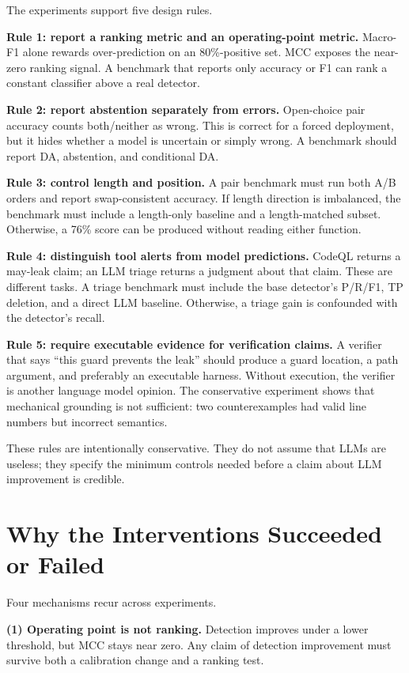 \documentclass[conference]{IEEEtran}
\begin{document}
The experiments support five design rules.

\textbf{Rule 1: report a ranking metric and an operating-point metric.} Macro-F1 alone rewards over-prediction on an 80\%-positive set. MCC exposes the near-zero ranking signal. A benchmark that reports only accuracy or F1 can rank a constant classifier above a real detector.

\textbf{Rule 2: report abstention separately from errors.} Open-choice pair accuracy counts both/neither as wrong. This is correct for a forced deployment, but it hides whether a model is uncertain or simply wrong. A benchmark should report DA, abstention, and conditional DA.

\textbf{Rule 3: control length and position.} A pair benchmark must run both A/B orders and report swap-consistent accuracy. If length direction is imbalanced, the benchmark must include a length-only baseline and a length-matched subset. Otherwise, a 76\% score can be produced without reading either function.

\textbf{Rule 4: distinguish tool alerts from model predictions.} CodeQL returns a may-leak claim; an LLM triage returns a judgment about that claim. These are different tasks. A triage benchmark must include the base detector's P/R/F1, TP deletion, and a direct LLM baseline. Otherwise, a triage gain is confounded with the detector's recall.

\textbf{Rule 5: require executable evidence for verification claims.} A verifier that says ``this guard prevents the leak'' should produce a guard location, a path argument, and preferably an executable harness. Without execution, the verifier is another language model opinion. The conservative experiment shows that mechanical grounding is not sufficient: two counterexamples had valid line numbers but incorrect semantics.

These rules are intentionally conservative. They do not assume that LLMs are useless; they specify the minimum controls needed before a claim about LLM improvement is credible.

\section{Why the Interventions Succeeded or Failed}
\label{sec:discussion}

Four mechanisms recur across experiments.

\textbf{(1) Operating point is not ranking.} Detection improves under a lower threshold, but MCC stays near zero. Any claim of detection improvement must survive both a calibration change and a ranking test.
\end{document}
